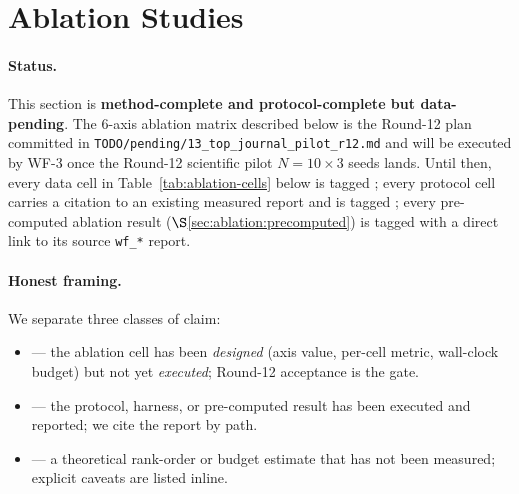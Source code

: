 %
%

\section{Ablation Studies}
\label{sec:ablation}

\paragraph{Status.}
This section is \textbf{method-complete and protocol-complete but
data-pending}.  The 6-axis ablation matrix described below is the
Round-12 plan committed in \texttt{TODO/pending/13\_top\_journal\_pilot\_r12.md}
and will be executed by WF-3 once the Round-12 scientific pilot
$N = 10 \times 3$ seeds lands.  Until then, every data cell in
Table~\ref{tab:ablation-cells} below is tagged \DESIGN{}; every
protocol cell carries a citation to an existing measured report and
is tagged \MEASURED{}; every pre-computed ablation result
($\S$\ref{sec:ablation:precomputed}) is tagged \MEASURED{} with a
direct link to its source \texttt{wf\_*} report.

\paragraph{Honest framing.}
We separate three classes of claim:
\begin{itemize}
  \item \textbf{\DESIGN{}} --- the ablation cell has been
        \emph{designed} (axis value, per-cell metric, wall-clock
        budget) but not yet \emph{executed}; Round-12 acceptance
        is the gate.
  \item \textbf{\MEASURED{}} --- the protocol, harness, or
        pre-computed result has been executed and reported; we
        cite the report by path.
  \item \textbf{\PROJECTED{}} --- a theoretical rank-order or
        budget estimate that has not been measured; explicit
        caveats are listed inline.
\end{itemize}

